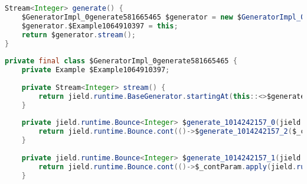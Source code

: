 \begin{lstlisting}[language=Java, caption={Az $1, 2$ sorozatot előállító generátor a transzformáció után}, captionpos=b, label=GenAfter, escapechar=!]
Stream<Integer> generate() {                                                                                                    
    $GeneratorImpl_0generate581665465 $generator = new $GeneratorImpl_0generate581665465();                                   
    $generator.$Example1064910397 = this;                                                                                      
    return $generator.stream();                                                                                                 
}                                                                                                                               
                                                                                                                                
private final class $GeneratorImpl_0generate581665465 {                                                                        
    private Example $Example1064910397;                                                                                        
                                                                                                                                
    private Stream<Integer> stream() {                                                                                          
        return jield.runtime.BaseGenerator.startingAt(this::<>$generate_1014242157_0).stream();                                 
    }                                                                                                                           
                                                                                                                                
    private jield.runtime.Bounce<Integer> $generate_1014242157_0(jield.runtime.GeneratorState<java.lang.Integer> $_contParam) { 
        return jield.runtime.Bounce.cont(()->$generate_1014242157_2($_contParam), 1);                                           
    }                                                                                                                           
                                                                                                                                
    private jield.runtime.Bounce<Integer> $generate_1014242157_1(jield.runtime.GeneratorState<java.lang.Integer> $_contParam) { 
        return jield.runtime.Bounce.cont(()->$_contParam.apply(jield.runtime.GeneratorState.empty()));                          
    }                                                                                                                           
                                                                                                                                

\end{lstlisting}
